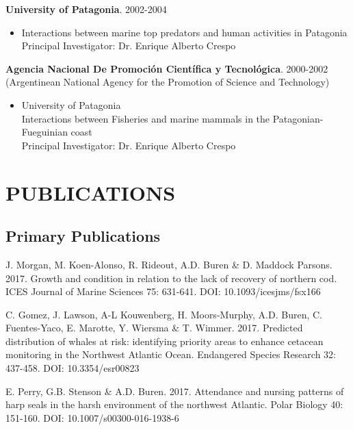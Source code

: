 \documentclass{res}
\begin{document}
\begin{resume}
\textbf{University of Patagonia}. 2002-2004
\begin{itemize} %
	\item[] Interactions between marine top predators and human activities in Patagonia\\
Principal Investigator: Dr. Enrique Alberto Crespo
\end{itemize}



\textbf{Agencia Nacional De Promoci\'{o}n Cient\'{i}fica y Tecnol\'{o}gica}. 2000-2002\\
(Argentinean National Agency for the Promotion of Science and Technology)
\begin{itemize} %
	\item[] University of Patagonia\\
Interactions between Fisheries and marine mammals in the Patagonian-Fueguinian coast\\
Principal Investigator: Dr. Enrique Alberto Crespo
\end{itemize}

\newpage
\section{PUBLICATIONS} 
\subsection{Primary Publications}
\begin{hangparas}{.4in}{1}

J. Morgan, M. Koen-Alonso, R. Rideout, A.D. Buren \& D. Maddock Parsons. 2017. Growth and condition in relation to the lack of recovery of northern cod. ICES Journal of Marine Sciences 75: 631-641. DOI: 10.1093/icesjms/fsx166

C. Gomez,  J. Lawson, A-L Kouwenberg, H. Moors-Murphy, A.D. Buren, C. Fuentes-Yaco, E.  Marotte, Y. Wiersma \& T. Wimmer. 2017. Predicted distribution of whales at risk: identifying priority areas to enhance cetacean monitoring in the Northwest Atlantic Ocean. Endangered Species Research 32: 437-458. DOI: 10.3354/esr00823

E. Perry, G.B. Stenson \& A.D. Buren. 2017. Attendance and nursing patterns of harp seals in the harsh environment of the northwest Atlantic. Polar Biology 40: 151-160. DOI: 10.1007/s00300-016-1938-6


\end{hangparas}
\end{resume}
\end{document}

